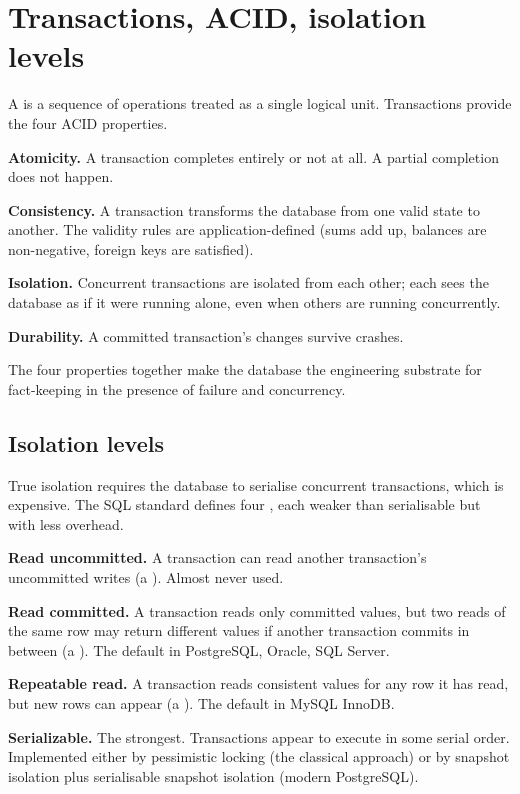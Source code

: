 \section{Transactions, ACID, isolation levels}

A  is a sequence of operations treated as a single logical unit. Transactions provide the four ACID properties.

\textbf{Atomicity.} A transaction completes entirely or not at all. A partial completion does not happen.

\textbf{Consistency.} A transaction transforms the database from one valid state to another. The validity rules are application-defined (sums add up, balances are non-negative, foreign keys are satisfied).

\textbf{Isolation.} Concurrent transactions are isolated from each other; each sees the database as if it were running alone, even when others are running concurrently.

\textbf{Durability.} A committed transaction's changes survive crashes.

The four properties together make the database the engineering substrate for fact-keeping in the presence of failure and concurrency.

\subsection{Isolation levels}

True isolation requires the database to serialise concurrent transactions, which is expensive. The SQL standard defines four , each weaker than serialisable but with less overhead.

\textbf{Read uncommitted.} A transaction can read another transaction's uncommitted writes (a ). Almost never used.

\textbf{Read committed.} A transaction reads only committed values, but two reads of the same row may return different values if another transaction commits in between (a ). The default in PostgreSQL, Oracle, SQL Server.

\textbf{Repeatable read.} A transaction reads consistent values for any row it has read, but new rows can appear (a ). The default in MySQL InnoDB.

\textbf{Serializable.} The strongest. Transactions appear to execute in some serial order. Implemented either by pessimistic locking (the classical approach) or by snapshot isolation plus serialisable snapshot isolation (modern PostgreSQL).

